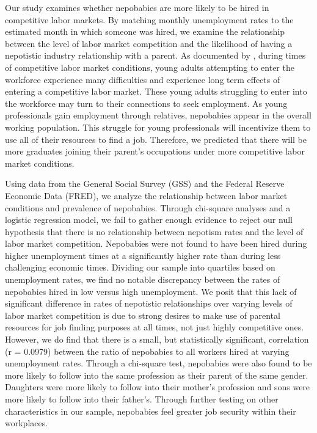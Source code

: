 \documentclass[12pt]{article}
\begin{document}
Our study examines whether nepobabies are more likely to be hired in competitive labor markets. By matching monthly unemployment rates to the estimated month in which someone was hired, we examine the relationship between the level of labor market competition and the likelihood of having a nepotistic industry relationship with a parent.
As documented by \cite{kahn_long-term_2010}, during times of competitive labor market conditions, young adults attempting to enter the workforce experience many difficulties and experience long term effects of entering a competitive labor market. These young adults struggling to enter into the workforce may turn to their connections to seek employment. As young professionals gain employment through relatives, nepobabies appear in the overall working population. This struggle for young professionals will incentivize them to use all of their resources to find a job. Therefore, we predicted that there will be more graduates joining their parent’s occupations under more competitive labor market conditions. 

Using data from the General Social Survey (GSS) and the Federal Reserve Economic Data (FRED), we analyze the relationship between labor market conditions and prevalence of nepobabies. Through chi-square analyses and a logistic regression model, we fail to gather enough evidence to reject our null hypothesis that there is no relationship between nepotism rates and the level of labor market competition. Nepobabies were not found to have been hired during higher unemployment times at a significantly higher rate than during less challenging economic times. Dividing our sample into  quartiles based on unemployment rates, we find no notable discrepancy between the rates of nepobabies hired in low versus high unemployment. We posit that this lack of significant difference in rates of nepotistic relationships over varying levels of labor market competition is due to strong desires to make use of parental resources for job finding purposes at all times, not just highly competitive ones. However, we do find that there is a small, but statistically significant, correlation (r = 0.0979) between the ratio of nepobabies to all workers hired at varying unemployment rates. Through a chi-square test, nepobabies were also found to be more likely to follow into the same profession as their parent of the same gender. Daughters were more likely to follow into their mother's profession and sons were more likely to follow into their father's. Through further testing on other characteristics in our sample, nepobabies feel greater job security within their workplaces.
\end{document}
